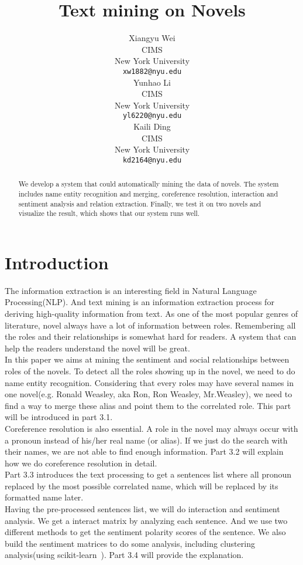 \documentclass[11pt]{article}
\title{Text mining on Novels}
\author{Xiangyu Wei \\
  CIMS \\
  New York University \\
  {\tt xw1882@nyu.edu} \\\And
  Yunhao Li \\ 
  CIMS \\
  New York University \\
  {\tt yl6220@nyu.edu} \\\And
  Kaili Ding \\ 
  CIMS \\
  New York University \\
  {\tt kd2164@nyu.edu} \\}
\begin{document}
\maketitle
\begin{abstract} %
  We develop a system that could automatically mining the data of novels. The system includes name entity recognition and merging, coreference resolution, interaction and sentiment analysis and relation extraction. Finally, we test it on two novels and visualize the result, which shows that our system runs well.
\end{abstract}

\section{Introduction} %

The information extraction is an interesting field in Natural Language Processing(NLP). And text mining is an information extraction process for deriving high-quality information from text. As one of the most popular genres of literature, novel always have a lot of information between roles. Remembering all the roles and their relationships is somewhat hard for readers. A system that can help the readers understand the novel will be great. \\

In this paper we aims at mining the sentiment and social relationships between roles of the novels. To detect all the roles showing up in the novel, we need to do name entity recognition. Considering that every roles may have several names in one novel(e.g. Ronald Weasley, aka Ron, Ron Weasley, Mr.Weasley), we need to find a way to merge these alias and point them to the correlated role. This part will be introduced in part 3.1. \\

Coreference resolution is also essential. A role in the novel may always occur with a pronoun instead of his/her real name (or alias). If we just do the search with their names, we are not able to find enough information. Part 3.2 will explain how we do coreference resolution in detail.  \\

Part 3.3 introduces the text processing to get a sentences list where all pronoun replaced by the most possible correlated name, which will be replaced by its formatted name later.  \\

Having the pre-processed sentences list, we will do interaction and sentiment analysis. We get a interact matrix by analyzing each sentence. And we use two different methods to get the sentiment polarity scores of the sentence. We also build the sentiment matrices to do some analysis, including clustering analysis(using scikit-learn~\cite{sklearn_api}). Part 3.4 will provide the explanation. \\
\end{document}
